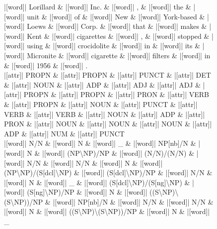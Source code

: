 \documentclass[10pt,a4paper]{article}
\begin{document}
\begin{figure}[h]
{\begin{dependency}[theme = simple]
\begin{deptext}[column sep=1em, row sep=0.1em]
|[word]| Lorillard \& |[word]| Inc. \& |[word]| , \& |[word]| the \& |[word]| unit \& |[word]| of \& |[word]| New \& |[word]| York-based \& |[word]| Loews \& |[word]| Corp. \& |[word]| that \& |[word]| makes \& |[word]| Kent \& |[word]| cigarettes \& |[word]| , \& |[word]| stopped \& |[word]| using \& |[word]| crocidolite \& |[word]| in \& |[word]| its \& |[word]| Micronite \& |[word]| cigarette \& |[word]| filters \& |[word]| in \& |[word]| 1956 \& |[word]| . \\
|[attr]| PROPN \& |[attr]| PROPN \& |[attr]| PUNCT \& |[attr]| DET \& |[attr]| NOUN \& |[attr]| ADP \& |[attr]| ADJ \& |[attr]| ADJ \& |[attr]| PROPN \& |[attr]| PROPN \& |[attr]| PRON \& |[attr]| VERB \& |[attr]| PROPN \& |[attr]| NOUN \& |[attr]| PUNCT \& |[attr]| VERB \& |[attr]| VERB \& |[attr]| NOUN \& |[attr]| ADP \& |[attr]| PRON \& |[attr]| NOUN \& |[attr]| NOUN \& |[attr]| NOUN \& |[attr]| ADP \& |[attr]| NUM \& |[attr]| PUNCT \\
|[word]| N/N \& |[word]| N \& |[word]| \_ \& |[word]| NP{[}nb{]}/N \& |[word]| N \& |[word]| (NP\textbackslash{}NP)/NP \& |[word]| (N/N)/(N/N) \& |[word]| N/N \& |[word]| N/N \& |[word]| N \& |[word]| (NP\textbackslash{}NP)/(S{[}dcl{]}\textbackslash{}NP) \& |[word]| (S{[}dcl{]}\textbackslash{}NP)/NP \& |[word]| N/N \& |[word]| N \& |[word]| \_ \& |[word]| (S{[}dcl{]}\textbackslash{}NP)/(S{[}ng{]}\textbackslash{}NP) \& |[word]| (S{[}ng{]}\textbackslash{}NP)/NP \& |[word]| N \& |[word]| ((S\textbackslash{}NP)\textbackslash{}(S\textbackslash{}NP))/NP \& |[word]| NP{[}nb{]}/N \& |[word]| N/N \& |[word]| N/N \& |[word]| N \& |[word]| ((S\textbackslash{}NP)\textbackslash{}(S\textbackslash{}NP))/NP \& |[word]| N \& |[word]| \_ \\
\end{deptext}




\end{dependency}}
\end{figure}
\end{document}
